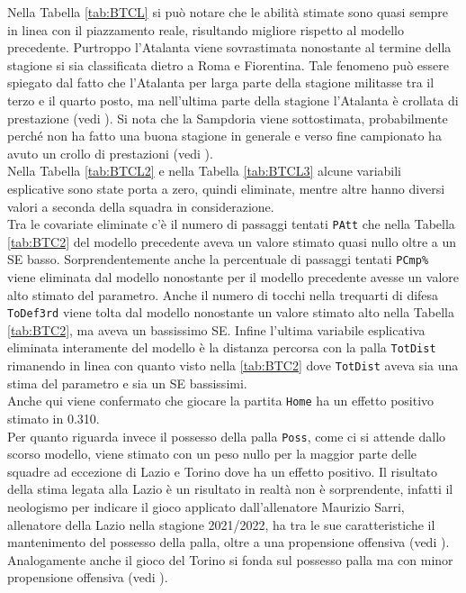 Nella Tabella \ref{tab:BTCL} si può notare che le abilità stimate sono quasi sempre  in linea con il piazzamento reale, risultando migliore rispetto al modello precedente. Purtroppo l'Atalanta viene sovrastimata nonostante al termine della stagione si sia classificata dietro a Roma e Fiorentina. Tale fenomeno può essere spiegato dal fatto che l'Atalanta per larga parte della stagione militasse tra il terzo e il quarto posto, ma nell'ultima parte della stagione l'Atalanta è crollata di prestazione (vedi \textit{\cite{site:storyAta}}). Si nota che la Sampdoria viene sottostimata, probabilmente perché non ha fatto una buona stagione in generale e verso fine campionato ha avuto un crollo di prestazioni (vedi \textit{\cite{site:storySamp}}).\\

Nella Tabella \ref{tab:BTCL2} e nella Tabella \ref{tab:BTCL3} alcune variabili esplicative sono state porta a zero, quindi eliminate, mentre altre hanno diversi valori a seconda della squadra in considerazione. \\
Tra le covariate eliminate c'è il numero di passaggi tentati \texttt{PAtt} che nella Tabella \ref{tab:BTC2} del modello precedente aveva un valore stimato quasi nullo oltre a un SE basso. Sorprendentemente anche la percentuale di passaggi tentati \texttt{PCmp\%} viene eliminata dal modello nonostante per il modello precedente avesse un valore alto stimato del parametro. Anche il numero di tocchi nella trequarti di difesa \texttt{ToDef3rd} viene tolta dal modello nonostante un valore stimato alto nella Tabella \ref{tab:BTC2}, ma aveva un bassissimo SE. Infine l'ultima variabile esplicativa eliminata interamente del modello è la distanza percorsa con la palla \texttt{TotDist} rimanendo in linea con quanto visto nella \ref{tab:BTC2} dove \texttt{TotDist} aveva sia una stima del parametro e sia un SE bassissimi.\\
Anche qui viene confermato che giocare la partita \texttt{Home} ha un effetto positivo stimato in 0.310.\\
Per quanto riguarda invece il possesso della palla \texttt{Poss}, come ci si attende dallo scorso modello, viene stimato con un peso nullo per la maggior parte delle squadre ad eccezione di Lazio e Torino dove ha un effetto positivo. Il risultato della stima legata alla Lazio è un risultato in realtà non è sorprendente, infatti il \textit{\cite{site:sarrismotr}} neologismo per indicare il gioco applicato dall'allenatore Maurizio Sarri, allenatore della Lazio nella stagione 2021/2022, ha tra le sue caratteristiche il mantenimento del possesso della palla, oltre a una propensione offensiva (vedi \textit{\cite{site:sarrismo}}). Analogamente anche il gioco del Torino si fonda sul possesso palla ma con minor propensione offensiva (vedi \textit{\cite{site:torino}}).\\
